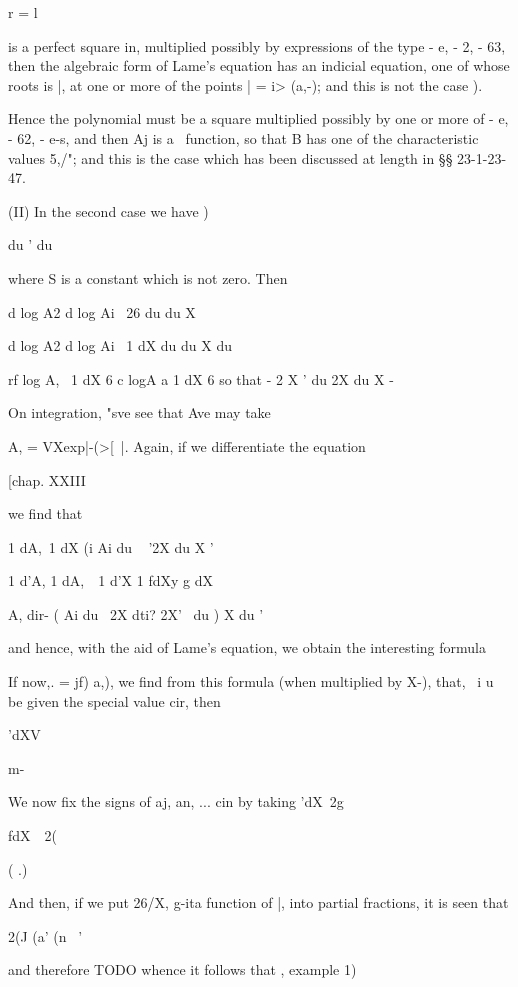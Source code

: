 {{{{{{{{r = l

is a perfect square in, multiplied possibly by expressions of the
type - e, - 2, - 63, then the algebraic form of Lame's equation has
an indicial equation, one of whose roots is |, at one or more of the
points | = i> (a,-); and this is not the case ).

Hence the polynomial must be a square multiplied possibly by one or
more of - e, - 62, - e-s, and then Aj is a \Lame\ function, so that B
has one of the characteristic values 5,/"; and this is the case which
has been discussed at length in §§ 23-1-23-47.

(II) In the second case we have )

du ' du

where S is a constant which is not zero. Then

d log A2 d log Ai \ 26 du du X

d log A2 d log Ai \ 1 dX du du X du

rf log A, \ 1 dX 6 c logA a 1 dX 6 so that - 2 X ' du 2X du X -

%
%

On integration, "sve see that Ave may take

A, = VXexp|-(>[~|. Again, if we differentiate the equation

[chap. XXIII

we find that

1 dA,\ 1 dX (i Ai du ~ '2X du X '

1 d'A, 1 dA,\ \ 1 d'X 1 fdXy g dX

A, dir- ( Ai du \ 2X dti? 2X' \ du ) X du '

and hence, with the aid of Lame's equation, we obtain the interesting
formula

If now,. = jf) a,), we find from this formula (when multiplied by
X-), that, \ i u be given the special value cir, then

'dXV

m-

We now fix the signs of aj, an, ... cin by taking 'dX\ 2g

fdX\ \ 2(

( .)

And then, if we put 26/X, g-ita function of |, into partial fractions,
it is seen that

2(J (a' (n \ '

and therefore
TODO
whence it
follows that , example 1)

}}}}}}}}
